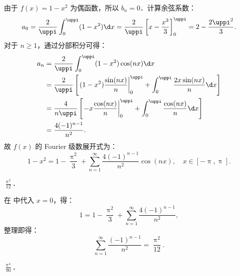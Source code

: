 \begin{solution}
    由于 $f(x) = 1 - x^2$ 为偶函数，所以 $b_n = 0$．计算余弦系数：
    \begin{equation}
        a_0 = \frac{2}{\uppi} \int_{0}^{\uppi} (1 - x^2) \d x = \frac{2}{\uppi} \left[ x - \frac{x^3}{3} \right]_{0}^{\uppi} = 2 - \frac{2\uppi^2}{3}.
    \end{equation}
    对于 $n \geqslant 1$，通过分部积分可得：
    \begin{equation}
        \begin{aligned}
            a_n & = \frac{2}{\uppi} \int_{0}^{\uppi} (1 - x^2) \cos(nx) \d x                                                                             \\
                & = \frac{2}{\uppi} \left[ \left. (1 - x^2) \frac{\sin(nx)}{n} \right|_{0}^{\uppi} + \int_{0}^{\uppi} \frac{2x \sin(nx)}{n} \d x \right] \\
                & = \frac{4}{n\uppi} \left[ \left. -x \frac{\cos(nx)}{n} \right|_{0}^{\uppi} + \int_{0}^{\uppi} \frac{\cos(nx)}{n} \d x \right]          \\
                & = \frac{4(-1)^{n-1}}{n^2}.
        \end{aligned}
    \end{equation}
    故 $f(x)$ 的 Fourier 级数展开式为：
    \begin{equation}\label{eq:fourier-series-x2}
        1 - x^2 = 1 - \frac{\uppi^2}{3} + \sum_{n=1}^{\infty} \frac{4(-1)^{n-1}}{n^2} \cos(nx), \quad x \in [-\uppi, \uppi].
    \end{equation}

     $\frac{\uppi^2}{12}$．

    在  中代入 $x = 0$，得：
    \begin{equation}
        1 = 1 - \frac{\uppi^2}{3} + \sum_{n=1}^{\infty} \frac{4(-1)^{n-1}}{n^2},
    \end{equation}
    整理即得：
    \begin{equation}
        \boxed{\sum_{n=1}^{\infty} \frac{(-1)^{n-1}}{n^2} = \frac{\uppi^2}{12}}.
    \end{equation}

     $\frac{\uppi^4}{90}$．


\end{solution}
